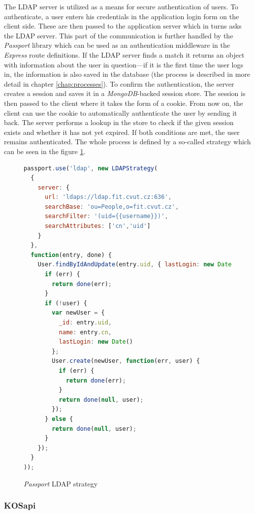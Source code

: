 \documentclass[thesis=M,english,hidelinks]{FITthesis}[2012/10/20]
\begin{document}
The LDAP server is utilized as a means for secure authentication of users. To authenticate, a user enters his credentials in the application login form on the client side. These are then passed to the application server which in turns asks the LDAP server. This part of the communication is further handled by the \textit{Passport} library \cite{passport} which can be used as an authentication middleware in the \textit{Express} route definitions. If the LDAP server finds a match it returns an object with information about the user in question---if it is the first time the user logs in, the information is also saved in the database (the process is described in more detail in chapter \ref{chap:processes}). To confirm the authentication, the server creates a session and saves it in a \textit{MongoDB}-backed session store. The session is then passed to the client where it takes the form of a cookie. From now on, the client can use the cookie to automatically authenticate the user by sending it back. The server performs a lookup in the store to check if the given session exists and whether it has not yet expired. If both conditions are met, the user remains authenticated. The whole process is defined by a so-called strategy which can be seen in the figure \ref{fig:passport_strategy}.

\begin{figure}
  \begin{lstlisting}[language=JavaScript]
passport.use('ldap', new LDAPStrategy(
  {
    server: {
      url: 'ldaps://ldap.fit.cvut.cz:636',
      searchBase: 'ou=People,o=fit.cvut.cz',
      searchFilter: '(uid={{username}})',
      searchAttributes: ['cn','uid']
    }
  },
  function(entry, done) {
    User.findByIdAndUpdate(entry.uid, { lastLogin: new Date() }, function(err, user) {
      if (err) {
        return done(err);
      }
      if (!user) {
        var newUser = {
          _id: entry.uid,
          name: entry.cn,
          lastLogin: new Date()
        };
        User.create(newUser, function(err, user) {
          if (err) {
            return done(err);
          }
          return done(null, user);
        });
      } else {
        return done(null, user);
      }
    });
  }
));
  \end{lstlisting}
  \caption{\textit{Passport} LDAP strategy}
  \label{fig:passport_strategy}
\end{figure}

      \subsubsection{KOSapi}
\end{document}
